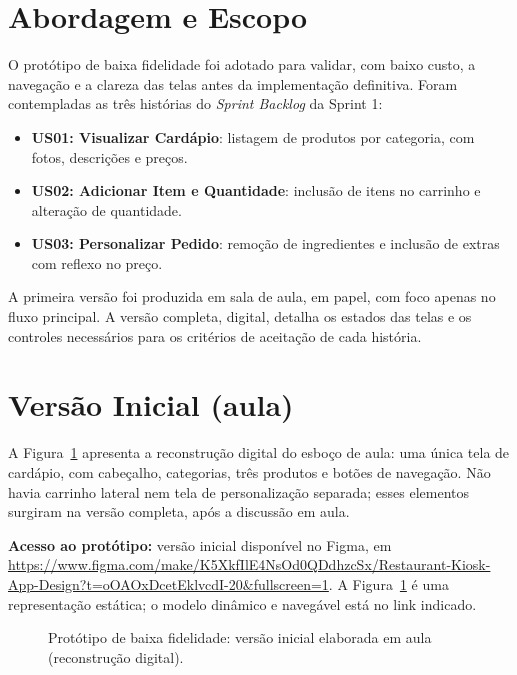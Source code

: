 \documentclass[12pt, oneside, a4paper, chapter=TITLE,section=TITLE]{abntex2}
\begin{document}
\section{Abordagem e Escopo}

O protótipo de baixa fidelidade foi adotado para validar, com baixo custo, a navegação e a clareza das telas antes da implementação definitiva. Foram contempladas as três histórias do \textit{Sprint Backlog} da Sprint 1:

\begin{itemize}
  \item \textbf{US01: Visualizar Cardápio}: listagem de produtos por categoria, com fotos, descrições e preços.
  \item \textbf{US02: Adicionar Item e Quantidade}: inclusão de itens no carrinho e alteração de quantidade.
  \item \textbf{US03: Personalizar Pedido}: remoção de ingredientes e inclusão de extras com reflexo no preço.
\end{itemize}

A primeira versão foi produzida em sala de aula, em papel, com foco apenas no fluxo principal. A versão completa, digital, detalha os estados das telas e os controles necessários para os critérios de aceitação de cada história.

\section{Versão Inicial (aula)}

A Figura~\ref{fig:wf_inicial} apresenta a reconstrução digital do esboço de aula: uma única tela de cardápio, com cabeçalho, categorias, três produtos e botões de navegação. Não havia carrinho lateral nem tela de personalização separada; esses elementos surgiram na versão completa, após a discussão em aula.

\textbf{Acesso ao protótipo:} versão inicial disponível no Figma, em \url{https://www.figma.com/make/K5XkfIlE4NsOd0QDdhzcSx/Restaurant-Kiosk-App-Design?t=oOAOxDcetEklvcdI-20&fullscreen=1}. A Figura~\ref{fig:wf_inicial} é uma representação estática; o modelo dinâmico e navegável está no link indicado.

\begin{figure}[ht]
\centering
{}
\caption{Protótipo de baixa fidelidade: versão inicial elaborada em aula (reconstrução digital).}
\label{fig:wf_inicial}
\end{figure}
\end{document}
